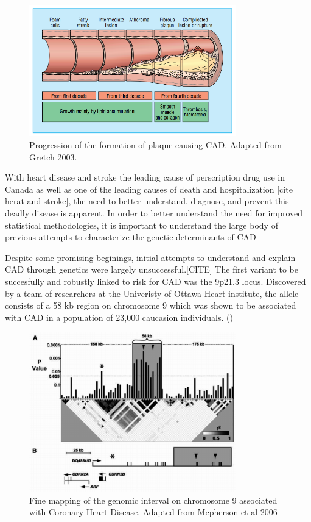 \begin{figure}[h]
\caption{Progression of the formation of plaque causing \ac{CAD}. Adapted from Gretch 2003.}
\centering
\includegraphics[width=0.8\textwidth]{Figures/cad.png}
\end{figure}



With heart disease and stroke the leading cause of perscription drug use in Canada as well as one of the leading causes of death and hospitalization [cite herat and stroke], the need to better understand, diagnose, and prevent this deadly disease is apparent.  In order to better understand the need for improved statistical methodologies, it is important to understand the large body of previous attempts to characterize the genetic determinants of \ac{CAD}

Despite some promising beginings, initial attempts to understand and explain \ac{CAD} through genetics were largely unsuccessful.[CITE] The first variant to be succesfully and robustly linked to risk for \ac{CAD} was the 9p21.3 locus. Discovered by a team of researchers at the Univeristy of Ottawa Heart institute, the allele consists of a 58 \ac{kb} region on chromosome 9 which was shown to be associated with \ac{CAD} in a population of 23,000 caucasion individuals. (\cite{McPherson2016})

\begin{figure}[h]
\caption{Fine mapping of the genomic interval on chromosome 9 associated with Coronary Heart Disease. Adapted from Mcpherson et al 2006}
\centering
\includegraphics[width=0.8\textwidth]{Figures/9p21.png}
\end{figure}

